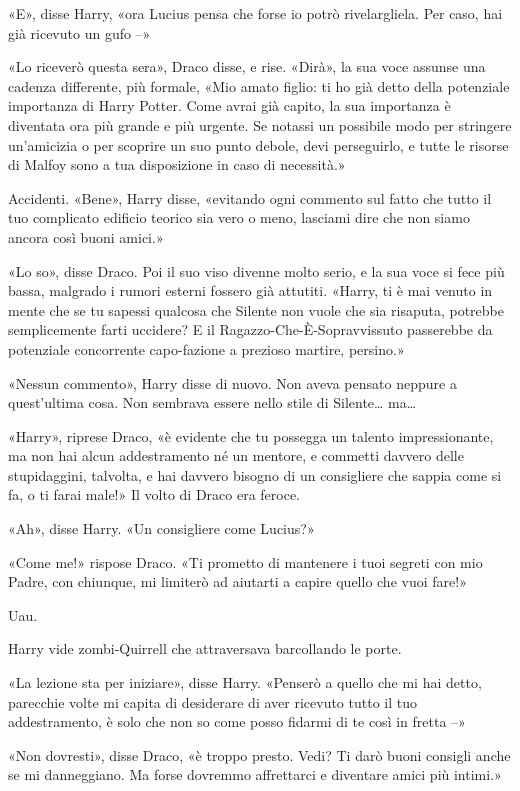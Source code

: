 «E», disse Harry, «ora Lucius pensa che forse io potrò rivelargliela. Per caso, hai già ricevuto un gufo –»

«Lo riceverò questa sera», Draco disse, e rise. «Dirà», la sua voce assunse una cadenza differente, più formale, «Mio amato figlio: ti ho già detto della potenziale importanza di Harry Potter. Come avrai già capito, la sua importanza è diventata ora più grande e più urgente. Se notassi un possibile modo per stringere un’amicizia o per scoprire un suo punto debole, devi perseguirlo, e tutte le risorse di Malfoy sono a tua disposizione in caso di necessità.»

Accidenti. «Bene», Harry disse, «evitando ogni commento sul fatto che tutto il tuo complicato edificio teorico sia vero o meno, lasciami dire che non siamo ancora così buoni amici.»

«Lo so», disse Draco. Poi il suo viso divenne molto serio, e la sua voce si fece più bassa, malgrado i rumori esterni fossero già attutiti. «Harry, ti è mai venuto in mente che se tu sapessi qualcosa che Silente non vuole che sia risaputa, potrebbe semplicemente farti uccidere? E il Ragazzo-Che-È-Sopravvissuto passerebbe da potenziale concorrente capo-fazione a prezioso martire, persino.»

«Nessun commento», Harry disse di nuovo. Non aveva pensato neppure a quest’ultima cosa. Non sembrava essere nello stile di Silente… ma…

«Harry», riprese Draco, «è evidente che tu possegga un talento impressionante, ma non hai alcun addestramento né un mentore, e commetti davvero delle stupidaggini, talvolta, e hai davvero bisogno di un consigliere che sappia come si fa, o ti farai male!» Il volto di Draco era feroce.

«Ah», disse Harry. «Un consigliere come Lucius?»

«Come me!» rispose Draco. «Ti prometto di mantenere i tuoi segreti con mio Padre, con chiunque, mi limiterò ad aiutarti a capire quello che vuoi fare!»

Uau.

Harry vide zombi-Quirrell che attraversava barcollando le porte.

«La lezione sta per iniziare», disse Harry. «Penserò a quello che mi hai detto, parecchie volte mi capita di desiderare di aver ricevuto tutto il tuo addestramento, è solo che non so come posso fidarmi di te così in fretta –»

«Non dovresti», disse Draco, «è troppo presto. Vedi? Ti darò buoni consigli anche se mi danneggiano. Ma forse dovremmo affrettarci e diventare amici più intimi.»

